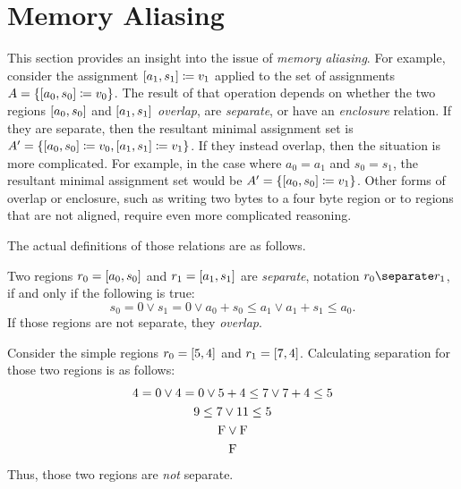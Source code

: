 \section{Memory Aliasing}\label{sse:memory_aliasing}
This section provides an insight into the issue of \emph{memory aliasing}.%
For example, consider the assignment $[a_1,s_1]\coloneqq v_1$
applied to the set of assignments $A=\{[a_0,s_0]\coloneqq v_0\}$.
The result of that operation
depends on whether the two regions $[a_0,s_0]$ and $[a_1,s_1]$
\emph{overlap}, are \emph{separate}, or have an \emph{enclosure} relation.%
%
%
If they are separate, then the resultant minimal assignment set is
$A'=\{[a_0,s_0]\coloneqq v_0,[a_1,s_1]\coloneqq v_1\}$.
If they instead overlap, then the situation is more complicated.
For example, in the case where $a_0=a_1$ and $s_0=s_1$,
the resultant minimal assignment set would be $A'=\{[a_0,s_0]\coloneqq v_1\}$.
Other forms of overlap or enclosure, such as writing two bytes to a four byte region
or to regions that are not aligned, require even more complicated reasoning.

The actual definitions of those relations are as follows.
\begin{definition}
  Two regions $r_0=[a_0,s_0]$ and $r_1=[a_1,s_1]$ are \emph{separate},
  notation $r_0\separate r_1$, if and only if the following is true:
  \begin{equation*}
    s_0=0\vee s_1=0\vee a_0+s_0\leq a_1\vee a_1+s_1\leq a_0.
  \end{equation*}
  If those regions are not separate, they \emph{overlap}.
\end{definition}
\begin{example}
  Consider the simple regions $r_0=[5,4]$ and $r_1=[7,4]$.
  Calculating separation for those two regions is as follows:
  \begin{gather*}
    4=0\vee 4=0\vee 5+4\leq 7\vee 7+4\leq 5 \\
    9\leq 7\vee 11\leq 5 \\
    \mathrm{F}\vee\mathrm{F} \\
    \mathrm{F}
  \end{gather*}
  Thus, those two regions are \emph{not} separate.
\end{example}

